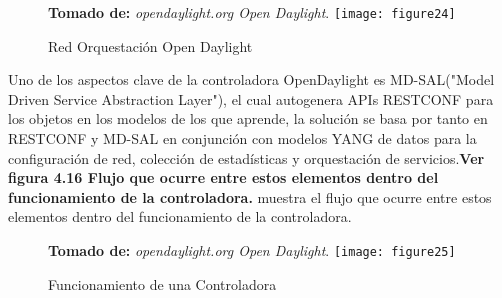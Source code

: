 \begin{figure}[htbp]
 \textbf{Tomado de:} \textit{opendaylight.org Open Daylight}.
  \centering
    {\texttt{[image: figure24]}}%
  \caption{Red Orquestación Open Daylight}
  \label{fig:fig2subfig}
\end{figure}

Uno de los aspectos clave de la controladora OpenDaylight es MD-SAL("Model Driven Service Abstraction Layer"), el cual autogenera APIs RESTCONF para los objetos en
los modelos de los que aprende, la solución se basa por tanto en RESTCONF y MD-SAL en conjunción con modelos YANG de datos para la configuración de red, colección de estadísticas y orquestación de servicios.\textbf{Ver figura 4.16 Flujo que ocurre entre estos elementos dentro del funcionamiento de la controladora.} muestra el flujo que ocurre entre estos elementos dentro del funcionamiento de la controladora.

\begin{figure}[htbp]
 \textbf{Tomado de:} \textit{opendaylight.org Open Daylight}.
  \centering
    {\texttt{[image: figure25]}}%
  \caption{Funcionamiento de una Controladora}
  \label{fig:fig2subfig}
\end{figure}




